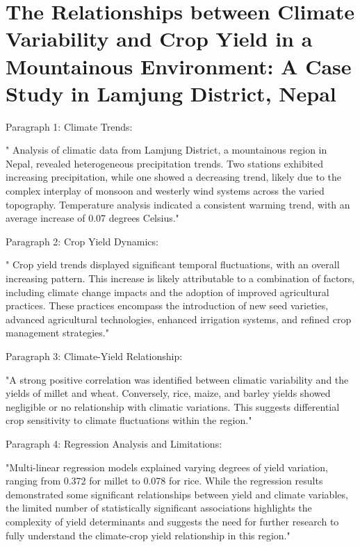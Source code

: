 \documentclass[a4paper,12pt]{article}
\begin{document}
\section{The Relationships between Climate Variability and Crop Yield in a Mountainous Environment: A Case Study in Lamjung District, Nepal}
\parencite{poudelRelationshipsClimateVariability2016}

Paragraph 1: Climate Trends:

"\parencite{poudelRelationshipsClimateVariability2016} Analysis of climatic data from Lamjung District, a mountainous region in Nepal, revealed heterogeneous precipitation trends. Two stations exhibited increasing precipitation, while one showed a decreasing trend, likely due to the complex interplay of monsoon and westerly wind systems across the varied topography. Temperature analysis indicated a consistent warming trend, with an average increase of 0.07 degrees Celsius."

Paragraph 2: Crop Yield Dynamics:

" \parencite{poudelRelationshipsClimateVariability2016}  Crop yield trends displayed significant temporal fluctuations, with an overall increasing pattern. This increase is likely attributable to a combination of factors, including climate change impacts and the adoption of improved agricultural practices. These practices encompass the introduction of new seed varieties, advanced agricultural technologies, enhanced irrigation systems, and refined crop management strategies."

Paragraph 3: Climate-Yield Relationship:

"A strong positive correlation was identified between climatic variability and the yields of millet and wheat. Conversely, rice, maize, and barley yields showed negligible or no relationship with climatic variations. This suggests differential crop sensitivity to climate fluctuations within the region."

Paragraph 4: Regression Analysis and Limitations:

"Multi-linear regression models explained varying degrees of yield variation, ranging from 0.372 for millet to 0.078 for rice. While the regression results demonstrated some significant relationships between yield and climate variables, the limited number of statistically significant associations highlights the complexity of yield determinants and suggests the need for further research to fully understand the climate-crop yield relationship in this region."
\end{document}
